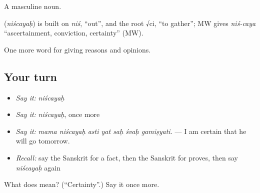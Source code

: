 A masculine noun.

\begin{cousinweb}
\textbf{} (\emph{niścayaḥ}) is built on \emph{niś}, \textquotedblleft{}out\textquotedblright{}, and the root √ci, \textquotedblleft{}to gather\textquotedblright{}; MW gives \emph{niś-caya} \textquotedblleft{}ascertainment, conviction, certainty\textquotedblright{} (MW).
\end{cousinweb}

\begin{grammarlens}[title={What you've built}]
One more word for giving reasons and opinions.
\end{grammarlens}

\subsection*{Your turn}
\begin{itemize}
\raggedright
  \item \emph{Say it:} \emph{niścayaḥ}
  \item \emph{Say it:} \emph{niścayaḥ}, once more
  \item \emph{Say it:} \emph{mama niścayaḥ asti yat saḥ śvaḥ gamiṣyati.} — I am certain that he will go tomorrow.
  \item \emph{Recall:} say the Sanskrit for a fact, then the Sanskrit for proves, then say \emph{niścayaḥ} again
\end{itemize}

\begin{tcolorbox}[breakable,colback=teal!4,colframe=teal!35!black,title={Before you move on}]
What does  mean? (\textquotedblleft{}Certainty\textquotedblright{}.) Say it once more.
\end{tcolorbox}
